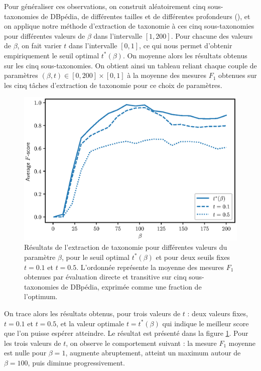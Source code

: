 Pour généraliser ces observations, on construit aléatoirement cinq sous-taxonomies de DBpédia, de différentes tailles et de différentes profondeurs (), et on applique notre méthode d'extraction de taxonomie à ces cinq sous-taxonomies pour différentes valeurs de $\beta$ dans l'intervalle $[1, 200]$. Pour chacune des valeurs de $\beta$, on fait varier $t$ dans l'intervalle $[0, 1]$, ce qui nous permet d'obtenir empiriquement le seuil optimal $t^*(\beta)$. On moyenne alors les résultats obtenus sur les cinq sous-taxonomies. On obtient ainsi un tableau reliant chaque couple de paramètres $(\beta, t) \in [0, 200] \times [0, 1]$ à la moyenne des mesures $F_1$ obtenues sur les cinq tâches d'extraction de taxonomie pour ce choix de paramètres.

\begin{figure}[h]
    \centering
    \includegraphics{fig/plot/average_beta_vs_best.eps}
    \caption[Influence du paramètre $\beta$]{Résultats de l'extraction de taxonomie pour différentes valeurs du paramètre $\beta$, pour le seuil optimal $t^*(\beta)$ et pour deux seuils fixes $t=0.1$ et $t=0.5$. L'ordonnée représente la moyenne des mesures $F_1$ obtenues par évaluation directe et transitive sur cinq sous-taxonomies de DBpédia, exprimée comme une fraction de l'optimum.}
    \label{fig:beta-search-1}
\end{figure}

On trace alors les résultats obtenus, pour trois valeurs de $t$ : deux valeurs fixes, $t = 0.1$ et $t = 0.5$, et la valeur optimale $t = t^*(\beta)$ qui indique le meilleur score que l'on puisse espérer atteindre. Le résultat est présenté dans la figure \ref{fig:beta-search-1}. Pour les trois valeurs de $t$, on observe le comportement suivant : la mesure $F_1$ moyenne est nulle pour $\beta = 1$, augmente abruptement, atteint un maximum autour de $\beta = 100$, puis diminue progressivement. 

